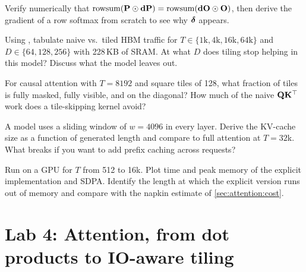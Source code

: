 \begin{exercise}
Verify numerically that $\operatorname{rowsum}(\mathbf{P}\odot\mathbf{dP})=\operatorname{rowsum}(\mathbf{dO}\odot\mathbf{O})$,
then derive the gradient of a row softmax from scratch to see why $\bm{\delta}$ appears.
\end{exercise}

\begin{exercise}[IO model]
Using , tabulate naive vs.\ tiled HBM traffic for
$T\in\{1\text{k},4\text{k},16\text{k},64\text{k}\}$ and $D\in\{64,128,256\}$ with 228\,KB of SRAM.
At what $D$ does tiling stop helping in this model? Discuss what the model leaves out.
\end{exercise}

\begin{exercise}
For causal attention with $T=8192$ and square tiles of 128, what fraction of tiles is fully masked,
fully visible, and on the diagonal? How much of the naive $\mathbf{Q}\mathbf{K}^\top$ work does a
tile-skipping kernel avoid?
\end{exercise}

\begin{exercise}
A model uses a sliding window of $w=4096$ in every layer. Derive the KV-cache size as a function of
generated length and compare to full attention at $T=32$k. What breaks if you want to add prefix
caching across requests?
\end{exercise}

\begin{exercise}[measurement]
Run  on a GPU for $T$ from 512 to 16k. Plot time and peak
memory of the explicit implementation and SDPA. Identify the length at which the explicit version
runs out of memory and compare with the napkin estimate of \cref{sec:attention:cost}.
\end{exercise}

\section{Lab 4: Attention, from dot products to IO-aware tiling}\label{sec:attention:lab}


